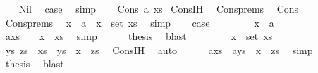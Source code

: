 \begin{isabellebody}
\ \ \isamarkupfalse%
\ Nil\ \isamarkupfalse%
\ {\isacharquery}{\kern0pt}case\ \isamarkupfalse%
\ simp\isanewline
{}\isamarkupfalse%
\isanewline
\ \ \isamarkupfalse%
\ {\isacharparenleft}{\kern0pt}Cons\ a\ xs{\isacharparenright}{\kern0pt}\isanewline
{}\isamarkupfalse%
\ Cons{\isachardot}{\kern0pt}IH\ \isanewline
{}\isamarkupfalse%
\ Cons{\isachardot}{\kern0pt}prems\ \isanewline
{}\isamarkupfalse%
\ Cons\isanewline
\ \ \isamarkupfalse%
\ Cons{\isachardot}{\kern0pt}prems\ \isamarkupfalse%
\ {\isachardoublequoteopen}x\ {\isacharequal}{\kern0pt}\ a\ {\isasymor}\ x\ {\isacharcolon}{\kern0pt}\ set\ xs{\isachardoublequoteclose}\ \isamarkupfalse%
\ simp\isanewline
\ \ \isamarkupfalse%
\ {\isacharquery}{\kern0pt}case\isanewline
\ \ \isamarkupfalse%
\isanewline
\ \ \ \ \isamarkupfalse%
\ {\isachardoublequoteopen}x\ {\isacharequal}{\kern0pt}\ a{\isachardoublequoteclose}\isanewline
\ \ \ \ \isamarkupfalse%
\ {\isachardoublequoteopen}a{\isacharhash}{\kern0pt}xs\ {\isacharequal}{\kern0pt}\ {\isacharbrackleft}{\kern0pt}{\isacharbrackright}{\kern0pt}\ {\isacharat}{\kern0pt}\ x\ {\isacharhash}{\kern0pt}\ xs{\isachardoublequoteclose}\ \isamarkupfalse%
\ simp\isanewline
\ \ \ \ \isamarkupfalse%
\ {\isacharquery}{\kern0pt}thesis\ \isamarkupfalse%
\ blast\isanewline
\ \ \isamarkupfalse%
\isanewline
\ \ \ \ \isamarkupfalse%
\ {\isachardoublequoteopen}x\ {\isacharcolon}{\kern0pt}\ set\ xs{\isachardoublequoteclose}\isanewline
\ \ \ \ \isamarkupfalse%
\ \isamarkupfalse%
\ ys\ zs\ \ {\isachardoublequoteopen}xs\ {\isacharequal}{\kern0pt}\ ys\ {\isacharat}{\kern0pt}\ x\ {\isacharhash}{\kern0pt}\ zs{\isachardoublequoteclose}\ \isamarkupfalse%
\ Cons{\isachardot}{\kern0pt}IH\ \isamarkupfalse%
\ auto\isanewline
\ \ \ \ \isamarkupfalse%
\ {\isachardoublequoteopen}a{\isacharhash}{\kern0pt}xs\ {\isacharequal}{\kern0pt}\ {\isacharparenleft}{\kern0pt}a{\isacharhash}{\kern0pt}ys{\isacharparenright}{\kern0pt}\ {\isacharat}{\kern0pt}\ x\ {\isacharhash}{\kern0pt}\ zs{\isachardoublequoteclose}\ \isamarkupfalse%
\ simp\isanewline
\ \ \ \ \isamarkupfalse%
\ {\isacharquery}{\kern0pt}thesis\ \isamarkupfalse%
\ blast\isanewline
\ \ \isamarkupfalse%

\end{isabellebody}
